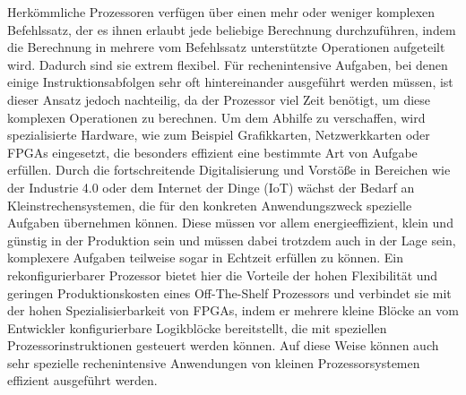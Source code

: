 Herkömmliche Prozessoren verfügen über einen mehr oder weniger komplexen Befehlssatz, der es ihnen erlaubt jede beliebige Berechnung durchzuführen,
indem die Berechnung in mehrere vom Befehlssatz unterstützte Operationen aufgeteilt wird. Dadurch sind sie extrem flexibel.
Für rechenintensive Aufgaben, bei denen einige Instruktionsabfolgen sehr oft hintereinander ausgeführt werden müssen, ist dieser Ansatz jedoch nachteilig,
da der Prozessor viel Zeit benötigt, um diese komplexen Operationen zu berechnen. Um dem Abhilfe zu verschaffen, wird spezialisierte Hardware,
wie zum Beispiel Grafikkarten, Netzwerkkarten oder FPGAs eingesetzt, die besonders effizient eine bestimmte Art von Aufgabe erfüllen.
Durch die fortschreitende Digitalisierung und Vorstöße in Bereichen wie der Industrie 4.0 oder dem Internet der Dinge (IoT) wächst der Bedarf an Kleinstrechensystemen,
die für den konkreten Anwendungszweck spezielle Aufgaben übernehmen können. Diese müssen vor allem energieeffizient, klein und günstig in der Produktion sein
und müssen dabei trotzdem auch in der Lage sein, komplexere Aufgaben teilweise sogar in Echtzeit erfüllen zu können.
Ein rekonfigurierbarer Prozessor bietet hier die Vorteile der hohen Flexibilität und geringen Produktionskosten eines Off-The-Shelf Prozessors
und verbindet sie mit der hohen Spezialisierbarkeit von FPGAs, indem er mehrere kleine Blöcke an vom Entwickler konfigurierbare Logikblöcke bereitstellt,
die mit speziellen Prozessorinstruktionen gesteuert werden können. Auf diese Weise können auch sehr spezielle rechenintensive Anwendungen von kleinen Prozessorsystemen
effizient ausgeführt werden.


